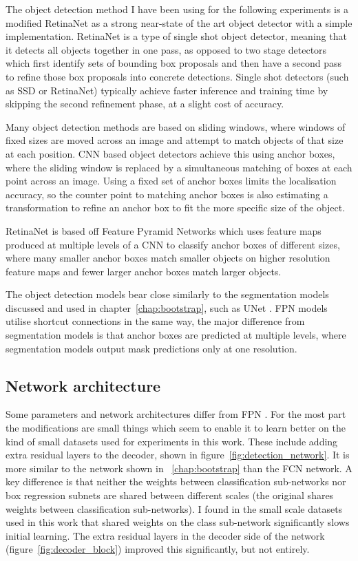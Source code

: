 The object detection method I have been using for the following experiments is a modified RetinaNet \cite{Lin2017} as a strong near-state of the art object detector with a simple implementation. RetinaNet is a type of single shot object detector, meaning that it detects all objects together in one pass, as opposed to two stage detectors which first identify sets of bounding box proposals and then have a second pass to refine those box proposals into concrete detections. Single shot detectors (such as \gls{SSD} \cite{Liu2016a} or RetinaNet) typically achieve faster inference and training time by skipping the second refinement phase, at a slight cost of accuracy.  

Many object detection methods are based on sliding windows, where windows of fixed sizes are moved across an image and attempt to match objects of that size at each position. \gls{CNN} based object detectors achieve this using anchor boxes, where the sliding window is replaced by a simultaneous matching of boxes at each point across an image. Using a fixed set of anchor boxes limits the localisation accuracy, so the counter point to matching anchor boxes is also estimating a transformation to refine an anchor box to fit the more specific size of the object.

RetinaNet is based off Feature Pyramid Networks \cite{Lin2017a} which uses feature maps produced at multiple levels of a \gls{CNN} to classify anchor boxes of different sizes, where many smaller anchor boxes match smaller objects on higher resolution feature maps and fewer larger anchor boxes match larger objects. 

The object detection models bear close similarly to the segmentation models discussed and used in chapter~\ref{chap:bootstrap}, such as UNet \cite{Ronneberger2015}. \gls{FPN} models utilise shortcut connections in the same way, the major difference from segmentation models is that anchor boxes are predicted at multiple levels, where segmentation models output mask predictions only at one resolution.


\subsection {Network architecture}
\label{sec:architecture}

Some parameters and network architectures differ from \gls{FPN} \cite{Lin2017a}. For the most part the modifications are small things which seem to enable it to learn better on the kind of small datasets used for experiments in this work. These include adding extra residual layers to the decoder, shown in figure~\ref{fig:detection_network}. It is more similar to the network shown in ~\ref{chap:bootstrap} than the \gls{FCN} network. A key difference is that neither the weights between classification sub-networks nor box regression subnets are shared between different scales  (the original shares weights between classification sub-networks). I found in the small scale datasets used in this work that shared weights on the class sub-network significantly slows initial learning. The extra residual layers in the decoder side of the network (figure~\ref{fig:decoder_block}) improved this significantly, but not entirely. 

